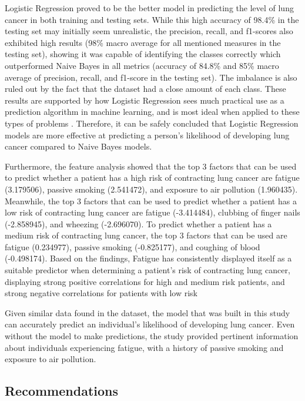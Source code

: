 \documentclass[runningheads]{llncs}
\begin{document}
Logistic Regression proved to be the better model in predicting the level of lung cancer in both training and testing sets. While this high accuracy of 98.4\% in the testing set may initially seem unrealistic, the precision, recall, and f1-scores also exhibited high results (98\% macro average for all mentioned measures in the testing set), showing it was capable of identifying the classes correctly which outperformed Naive Bayes in all metrics (accuracy of 84.8\% and 85\% macro average of precision, recall, and f1-score in the testing set). The imbalance is also ruled out by the fact that the dataset had a close amount of each class. These results are supported by how Logistic Regression sees much practical use as a prediction algorithm in machine learning, and is most ideal when applied to these types of problems \cite{cai2006prediction}. Therefore, it can be safely concluded that Logistic Regression models are more effective at predicting a person’s likelihood of developing lung cancer compared to Naive Bayes models.

Furthermore, the feature analysis showed that the top 3 factors that can be used to predict whether a patient has a high risk of contracting lung cancer are fatigue (3.179506), passive smoking (2.541472), and exposure to air pollution (1.960435). Meanwhile, the top 3 factors that can be used to predict whether a patient has a low risk of contracting lung cancer are fatigue (-3.414484), clubbing of finger nails (-2.858945), and wheezing (-2.696070). To predict whether a patient has a medium risk of contracting lung cancer, the top 3 factors that can be used are fatigue (0.234977), passive smoking (-0.825177), and coughing of blood (-0.498174). Based on the findings, Fatigue has consistently displayed itself as a suitable predictor when determining a patient's risk of contracting lung cancer, displaying strong positive correlations for high and medium risk patients, and strong negative correlations for patients with low risk
	
Given similar data found in the dataset, the model that was built in this study can accurately predict an individual’s likelihood of developing lung cancer. Even without the model to make predictions, the study provided pertinent information about individuals experiencing fatigue, with a history of passive smoking and exposure to air pollution.

\subsection{Recommendations}
\end{document}
